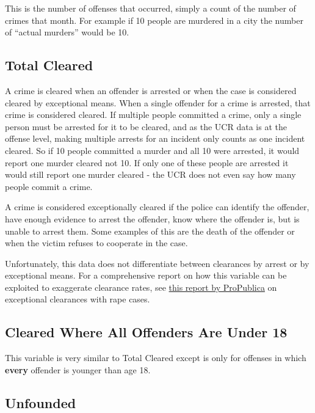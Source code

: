 \documentclass[
  12pt,
  openany]{book}
\begin{document}
This is the number of offenses that occurred, simply a count of the number of crimes that month. For example if 10 people are murdered in a city the number of ``actual murders'' would be 10.

\hypertarget{total-cleared}{%
\subsection{Total Cleared}\label{total-cleared}}

A crime is cleared when an offender is arrested or when the case is considered cleared by exceptional means. When a single offender for a crime is arrested, that crime is considered cleared. If multiple people committed a crime, only a single person must be arrested for it to be cleared, and as the UCR data is at the offense level, making multiple arrests for an incident only counts as one incident cleared. So if 10 people committed a murder and all 10 were arrested, it would report one murder cleared not 10. If only one of these people are arrested it would still report one murder cleared - the UCR does not even say how many people commit a crime.

A crime is considered exceptionally cleared if the police can identify the offender, have enough evidence to arrest the offender, know where the offender is, but is unable to arrest them. Some examples of this are the death of the offender or when the victim refuses to cooperate in the case.

Unfortunately, this data does not differentiate between clearances by arrest or by exceptional means. For a comprehensive report on how this variable can be exploited to exaggerate clearance rates, see \href{https://www.propublica.org/article/when-it-comes-to-rape-just-because-a-case-is-cleared-does-not-mean-solved}{this report by ProPublica} on exceptional clearances with rape cases.

\hypertarget{cleared-where-all-offenders-are-under-18}{%
\subsection{Cleared Where All Offenders Are Under 18}\label{cleared-where-all-offenders-are-under-18}}

This variable is very similar to Total Cleared except is only for offenses in which \textbf{every} offender is younger than age 18.

\hypertarget{unfounded}{%
\subsection{Unfounded}\label{unfounded}}
\end{document}
